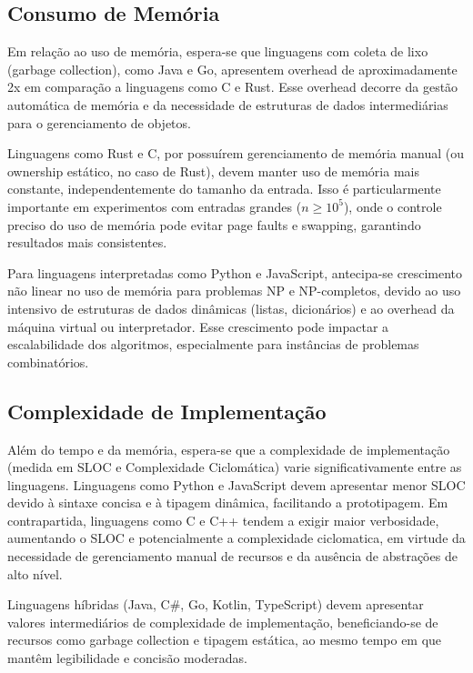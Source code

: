 \documentclass[12pt, a4paper]{article}
\begin{document}
\subsection{Consumo de Memória}

Em relação ao uso de memória, espera-se que linguagens com coleta de lixo (garbage collection), como Java e Go, apresentem overhead de aproximadamente 2x em comparação a linguagens como C e Rust. Esse overhead decorre da gestão automática de memória e da necessidade de estruturas de dados intermediárias para o gerenciamento de objetos.

Linguagens como Rust e C, por possuírem gerenciamento de memória manual (ou ownership estático, no caso de Rust), devem manter uso de memória mais constante, independentemente do tamanho da entrada. Isso é particularmente importante em experimentos com entradas grandes (\( n \geq 10^5 \)), onde o controle preciso do uso de memória pode evitar page faults e swapping, garantindo resultados mais consistentes.

Para linguagens interpretadas como Python e JavaScript, antecipa-se crescimento não linear no uso de memória para problemas NP e NP-completos, devido ao uso intensivo de estruturas de dados dinâmicas (listas, dicionários) e ao overhead da máquina virtual ou interpretador. Esse crescimento pode impactar a escalabilidade dos algoritmos, especialmente para instâncias de problemas combinatórios.

\subsection{Complexidade de Implementação}

Além do tempo e da memória, espera-se que a complexidade de implementação (medida em SLOC e Complexidade Ciclomática) varie significativamente entre as linguagens. Linguagens como Python e JavaScript devem apresentar menor SLOC devido à sintaxe concisa e à tipagem dinâmica, facilitando a prototipagem. Em contrapartida, linguagens como C e C++ tendem a exigir maior verbosidade, aumentando o SLOC e potencialmente a complexidade ciclomatica, em virtude da necessidade de gerenciamento manual de recursos e da ausência de abstrações de alto nível.

Linguagens híbridas (Java, C\#, Go, Kotlin, TypeScript) devem apresentar valores intermediários de complexidade de implementação, beneficiando-se de recursos como garbage collection e tipagem estática, ao mesmo tempo em que mantêm legibilidade e concisão moderadas.
\end{document}

